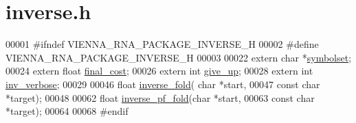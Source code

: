 \hypertarget{inverse_8h_source}{}\section{inverse.\+h}
\label{inverse_8h_source}

\begin{DoxyCode}
00001 \textcolor{preprocessor}{#ifndef VIENNA\_RNA\_PACKAGE\_INVERSE\_H}
00002 \textcolor{preprocessor}{#define VIENNA\_RNA\_PACKAGE\_INVERSE\_H}
00003 
00022 \textcolor{keyword}{extern} \textcolor{keywordtype}{char} *\hyperlink{group__inverse__fold_ga8f791e7740a5a28b9f6fafb4e60301d9}{symbolset};
00024 \textcolor{keyword}{extern}  \textcolor{keywordtype}{float} \hyperlink{group__inverse__fold_ga7f17d3b169af048d32bb185039a9c09c}{final\_cost};
00026 \textcolor{keyword}{extern}  \textcolor{keywordtype}{int}   \hyperlink{group__inverse__fold_ga7ec4ba51f86e1717a1e174264e4a75ce}{give\_up};
00028 \textcolor{keyword}{extern}  \textcolor{keywordtype}{int}   \hyperlink{group__inverse__fold_gafcfc65fba01b9cca5946726ed9057a63}{inv\_verbose};
00029 
00046 \textcolor{keywordtype}{float} \hyperlink{group__inverse__fold_ga7af026de55d4babad879f2c92559cbbc}{inverse\_fold}( \textcolor{keywordtype}{char} *start,
00047                     \textcolor{keyword}{const} \textcolor{keywordtype}{char} *target);
00048 
00062 \textcolor{keywordtype}{float} \hyperlink{group__inverse__fold_gaeef52ecbf2a2450ad585a344f9826806}{inverse\_pf\_fold}(\textcolor{keywordtype}{char} *start,
00063                       \textcolor{keyword}{const} \textcolor{keywordtype}{char} *target);
00064 
00068 \textcolor{preprocessor}{#endif}
\end{DoxyCode}
